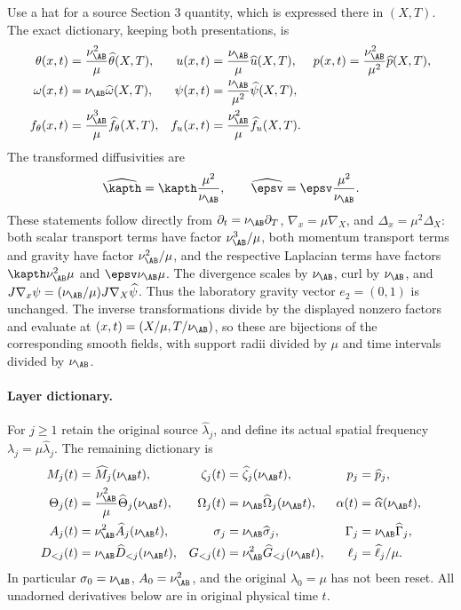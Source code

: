 Use a hat for a source Section 3 quantity, which is expressed there in $(X,T)$. The exact dictionary, keeping both presentations, is
\begin{align}
 \theta(x,t)&=\frac{\nu_{\AB}^2}{\mu}\widehat\theta(X,T),&
 u(x,t)&=\frac{\nu_{\AB}}\mu\widehat u(X,T),&
 p(x,t)&=\frac{\nu_{\AB}^2}{\mu^2}\widehat p(X,T),\label{cvlane:pc:eq:scaling}\\
 \omega(x,t)&=\nu_{\AB}\widehat\omega(X,T),&
 \psi(x,t)&=\frac{\nu_{\AB}}{\mu^2}\widehat\psi(X,T),\nonumber\\
 f_\theta(x,t)&=\frac{\nu_{\AB}^3}{\mu}\widehat f_\theta(X,T),&
 f_u(x,t)&=\frac{\nu_{\AB}^2}{\mu}\widehat f_u(X,T).\nonumber
\end{align}
The transformed diffusivities are
\begin{equation}\label{cvlane:pc:eq:scaled-diffusion}
 \widehat\kapth=\kapth\frac{\mu^2}{\nu_{\AB}},\qquad
 \widehat\epsv=\epsv\frac{\mu^2}{\nu_{\AB}}.
\end{equation}
These statements follow directly from $\partial_t=\nu_{\AB}\partial_T$, $\nabla_x=\mu\nabla_X$, and $\Delta_x=\mu^2\Delta_X$: both scalar transport terms have factor $\nu_{\AB}^3/\mu$, both momentum transport terms and gravity have factor $\nu_{\AB}^2/\mu$, and the respective Laplacian terms have factors $\kapth\nu_{\AB}^2\mu$ and $\epsv\nu_{\AB}\mu$. The divergence scales by $\nu_{\AB}$, curl by $\nu_{\AB}$, and $J\nabla_x\psi=(\nu_{\AB}/\mu)J\nabla_X\widehat\psi$. Thus the laboratory gravity vector $e_2=(0,1)$ is unchanged. The inverse transformations divide by the displayed nonzero factors and evaluate at $(x,t)=(X/\mu,T/\nu_{\AB})$, so these are bijections of the corresponding smooth fields, with support radii divided by $\mu$ and time intervals divided by $\nu_{\AB}$.

\paragraph{Layer dictionary.}
For $j\ge1$ retain the original source $\widehat\lambda_j$, and define its actual spatial frequency $\lambda_j=\mu\widehat\lambda_j$. The remaining dictionary is
\begin{align}
 M_j(t)&=\widehat M_j(\nu_{\AB}t),&\zeta_j(t)&=\widehat\zeta_j(\nu_{\AB}t),&p_j&=\widehat p_j,\\
 \Theta_j(t)&=\frac{\nu_{\AB}^2}{\mu}\widehat\Theta_j(\nu_{\AB}t),&
 \Omega_j(t)&=\nu_{\AB}\widehat\Omega_j(\nu_{\AB}t),&
 \alpha(t)&=\widehat\alpha(\nu_{\AB}t),\nonumber\\
 A_j(t)&=\nu_{\AB}^2\widehat A_j(\nu_{\AB}t),&
 \sigma_j&=\nu_{\AB}\widehat\sigma_j,&
 \Gamma_j&=\nu_{\AB}\widehat\Gamma_j,\nonumber\\
 D_{<j}(t)&=\nu_{\AB}\widehat D_{<j}(\nu_{\AB}t),&
 G_{<j}(t)&=\nu_{\AB}^2\widehat G_{<j}(\nu_{\AB}t),&
 \ell_j&=\widehat\ell_j/\mu.\nonumber
\end{align}
In particular $\sigma_0=\nu_{\AB}$, $A_0=\nu_{\AB}^2$, and the original $\lambda_0=\mu$ has not been reset. All unadorned derivatives below are in original physical time $t$.

